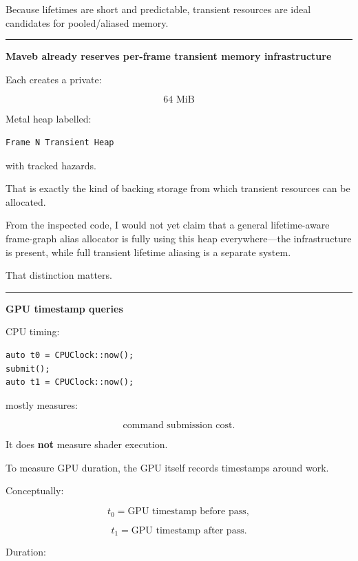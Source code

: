 Because lifetimes are short and predictable, transient resources are ideal candidates for pooled/aliased memory.

\begin{center}\rule{0.5\linewidth}{0.5pt}\end{center}

\textbf{Maveb already reserves per-frame transient memory infrastructure}

Each  creates a private:

\[
64\text{ MiB}
\]

Metal heap labelled:

\protect{}\label{p10-transient}%
\begin{verbatim}
Frame N Transient Heap
\end{verbatim}

with tracked hazards.

That is exactly the kind of backing storage from which transient resources can be allocated.

From the inspected code, I would not yet claim that a general lifetime-aware frame-graph alias allocator is fully using this heap everywhere---the infrastructure is present, while full transient lifetime aliasing is a separate system.

That distinction matters.

\begin{center}\rule{0.5\linewidth}{0.5pt}\end{center}

\textbf{GPU timestamp queries}

CPU timing:

\protect{}\label{p10-wrong-gpu-time}%
\begin{verbatim}
auto t0 = CPUClock::now();
submit();
auto t1 = CPUClock::now();
\end{verbatim}

mostly measures:

\[
\text{command submission cost}.
\]

It does \textbf{not} measure shader execution.

To measure GPU duration, the GPU itself records timestamps around work.

Conceptually:

\[
t_0=\text{GPU timestamp before pass},
\]

\[
t_1=\text{GPU timestamp after pass}.
\]

Duration:

